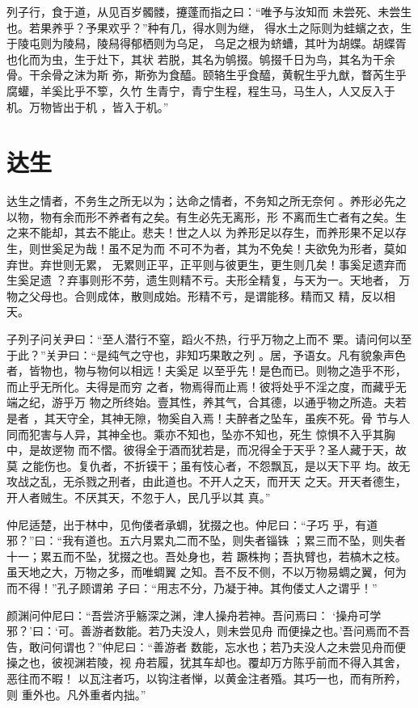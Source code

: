 \documentclass[a4paper,12pt,UTF8,twoside]{ctexbook}
\begin{document}
列子行，食于道，从见百岁髑髅，攓蓬而指之曰：“唯予与汝知而 未尝死、未尝生也。若果养乎？予果欢乎？”种有几，得水则为继， 得水土之际则为蛙蠙之衣，生于陵屯则为陵舄，陵舄得郁栖则为乌足， 乌足之根为蛴螬，其叶为胡蝶。胡蝶胥也化而为虫，生于灶下，其状 若脱，其名为鸲掇。鸲掇千日为鸟，其名为干余骨。干余骨之沫为斯 弥，斯弥为食醯。颐辂生乎食醯，黄軦生乎九猷，瞀芮生乎腐蠸，羊奚比乎不箰，久竹 生青宁，青宁生程，程生马，马生人，人又反入于机。万物皆出于机 ，皆入于机。”
\section{达生}

达生之情者，不务生之所无以为；达命之情者，不务知之所无奈何 。养形必先之以物，物有余而形不养者有之矣。有生必先无离形，形 不离而生亡者有之矣。生之来不能却，其去不能止。悲夫！世之人以 为养形足以存生，而养形果不足以存生，则世奚足为哉！虽不足为而 不可不为者，其为不免矣！夫欲免为形者，莫如弃世。弃世则无累， 无累则正平，正平则与彼更生，更生则几矣！事奚足遗弃而生奚足遗 ？弃事则形不劳，遗生则精不亏。夫形全精复，与天为一。天地者， 万物之父母也。合则成体，散则成始。形精不亏，是谓能移。精而又 精，反以相天。

子列子问关尹曰：“至人潜行不窒，蹈火不热，行乎万物之上而不 栗。请问何以至于此？”关尹曰：“是纯气之守也，非知巧果敢之列 。居，予语女。凡有貌象声色者，皆物也，物与物何以相远！夫奚足 以至乎先！是色而已。则物之造乎不形，而止乎无所化。夫得是而穷 之者，物焉得而止焉！彼将处乎不淫之度，而藏乎无端之纪，游乎万 物之所终始。壹其性，养其气，合其德，以通乎物之所造。夫若是者 ，其天守全，其神无隙，物奚自入焉！夫醉者之坠车，虽疾不死。骨 节与人同而犯害与人异，其神全也。乘亦不知也，坠亦不知也，死生 惊惧不入乎其胸中，是故遻物 而不慴。彼得全于酒而犹若是，而况得全于天乎？圣人藏于天，故莫 之能伤也。复仇者，不折镆干；虽有忮心者，不怨飘瓦，是以天下平 均。故无攻战之乱，无杀戮之刑者，由此道也。不开人之天，而开天 之天。开天者德生，开人者贼生。不厌其天，不忽于人，民几乎以其 真。”

仲尼适楚，出于林中，见佝偻者承蜩，犹掇之也。仲尼曰：“子巧 乎，有道邪？”曰：“我有道也。五六月累丸二而不坠，则失者锱铢 ；累三而不坠，则失者十一；累五而不坠，犹掇之也。吾处身也，若 蹶株拘；吾执臂也，若槁木之枝。虽天地之大，万物之多，而唯蜩翼 之知。吾不反不侧，不以万物易蜩之翼，何为而不得！”孔子顾谓弟 子曰：“用志不分，乃凝于神。其佝偻丈人之谓乎！”

颜渊问仲尼曰：“吾尝济乎觞深之渊，津人操舟若神。吾问焉曰： ‘操舟可学邪？’曰：‘可。善游者数能。若乃夫没人，则未尝见舟 而便操之也。’吾问焉而不吾告，敢问何谓也？”仲尼曰：“善游者 数能，忘水也；若乃夫没人之未尝见舟而便操之也，彼视渊若陵，视 舟若履，犹其车却也。覆却万方陈乎前而不得入其舍，恶往而不暇！ 以瓦注者巧，以钩注者惮，以黄金注者殙。其巧一也，而有所矜，则 重外也。凡外重者内拙。”
\end{document}
